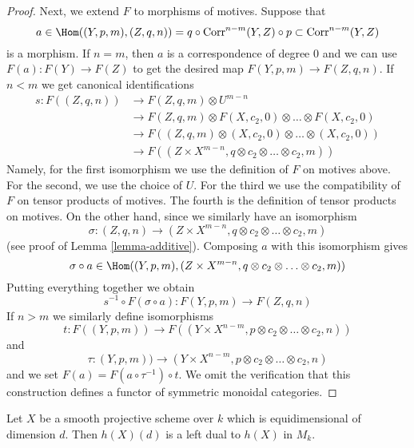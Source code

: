\begin{proof}
\medskip\noindent
Next, we extend $F$ to morphisms of motives. Suppose that
$$
a \in
\Hom((Y, p, m), (Z, q, n)) =
q \circ \text{Corr}^{n - m}(Y, Z) \circ p \subset \text{Corr}^{n - m}(Y, Z)
$$
is a morphism. If $n = m$, then $a$ is a correspondence of degree $0$
and we can use $F(a) : F(Y) \to F(Z)$ to get the desired map
$F(Y, p, m) \to F(Z, q, n)$. If $n < m$ we get canonical identifications
\begin{align*}
s : F((Z, q, n))
& \to
F(Z, q, m) \otimes U^{m - n} \\
& \to
F(Z, q, m) \otimes F(X, c_2, 0) \otimes \ldots \otimes F(X, c_2, 0) \\
& \to
F((Z, q, m) \otimes (X, c_2, 0) \otimes \ldots \otimes (X, c_2, 0)) \\
& \to
F((Z \times X^{m - n}, q \otimes c_2 \otimes \ldots \otimes c_2, m))
\end{align*}
Namely, for the first isomorphism we use the definition of $F$ on motives
above. For the second, we use the choice of $U$. For the third we use
the compatibility of $F$ on tensor products of motives. The fourth
is the definition of tensor products on motives. On the other hand, since
we similarly have an isomorphism
$$
\sigma : (Z, q, n) \to
(Z \times X^{m - n}, q \otimes c_2 \otimes \ldots \otimes c_2, m)
$$
(see proof of Lemma \ref{lemma-additive}). Composing $a$ with this isomorphism
gives
$$
\sigma \circ a \in
\Hom((Y, p, m),
(Z \times X^{m - n}, q \otimes c_2 \otimes \ldots \otimes c_2, m))
$$
Putting everything together we obtain
$$
s^{-1} \circ F(\sigma \circ a) :
F(Y, p, m) \to
F(Z, q, n)
$$
If $n > m$ we similarly define isomorphisms
$$
t : F((Y, p, m)) \to
F((Y \times X^{n - m}, p \otimes c_2 \otimes \ldots \otimes c_2, n))
$$
and
$$
\tau : (Y, p, m)) \to
(Y \times X^{n - m}, p \otimes c_2 \otimes \ldots \otimes c_2, n)
$$
and we set $F(a) = F(a \circ \tau^{-1}) \circ t$.
We omit the verification that this construction defines a functor
of symmetric monoidal categories.
\end{proof}

\begin{lemma}
\label{lemma-dual}
Let $X$ be a smooth projective scheme over $k$ which is equidimensional
of dimension $d$. Then $h(X)(d)$ is a left dual to $h(X)$ in $M_k$.
\end{lemma}

